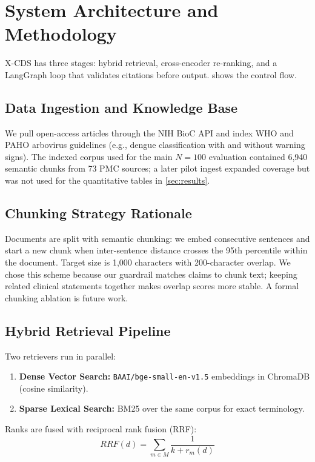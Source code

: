 \section{System Architecture and Methodology}\label{sec:methods}

X-CDS has three stages: hybrid retrieval, cross-encoder re-ranking, and a LangGraph loop that validates citations before output.  shows the control flow.



\subsection{Data Ingestion and Knowledge Base}
We pull open-access articles through the NIH BioC API \citep{comeau2019pmc} and index WHO and PAHO arbovirus guidelines (e.g., dengue classification with and without warning signs). The indexed corpus used for the main $N=100$ evaluation contained 6,940 semantic chunks from 73 PMC sources; a later pilot ingest expanded coverage but was not used for the quantitative tables in \cref{sec:results}.

\subsection{Chunking Strategy Rationale}
Documents are split with semantic chunking: we embed consecutive sentences and start a new chunk when inter-sentence distance crosses the 95th percentile within the document. Target size is 1,000 characters with 200-character overlap. We chose this scheme because our guardrail matches claims to chunk text; keeping related clinical statements together makes overlap scores more stable. A formal chunking ablation is future work.

\subsection{Hybrid Retrieval Pipeline}
Two retrievers run in parallel:
\begin{enumerate}
    \item \textbf{Dense Vector Search:} \texttt{BAAI/bge-small-en-v1.5} embeddings in ChromaDB (cosine similarity).
    \item \textbf{Sparse Lexical Search:} BM25 over the same corpus for exact terminology.
\end{enumerate}

Ranks are fused with reciprocal rank fusion (RRF):
\begin{equation}
RRF(d) = \sum_{m \in M} \frac{1}{k + r_m(d)}
\end{equation}

